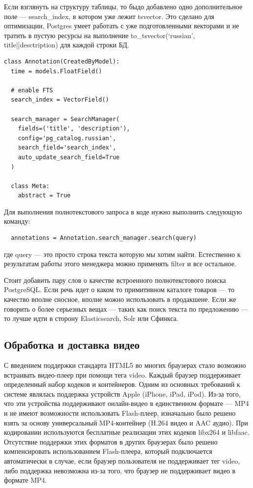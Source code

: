 Если взглянуть на структуру таблицы, то быдо добавлено одно дополнительное поле — search\_index,
в котором уже лежит tsvector. Это сделано для оптимизации, Postgres умеет работать с уже подготовленными векторами
и не тратить в пустую ресурсы на выполнение to\_tsvector(‘russian’, title||desctription) для каждой строки БД.

\FloatBarrier
\begin{lstlisting}[caption={Изменения в модели аннотации для возможности поиска}, label=lst:annotation]
class Annotation(CreatedByModel):
  time = models.FloatField()

  # enable FTS
  search_index = VectorField()

  search_manager = SearchManager(
    fields=('title', 'description'),
    config='pg_catalog.russian',
    search_field='search_index',
    auto_update_search_field=True
  )

  class Meta:
    abstract = True
\end{lstlisting}
\FloatBarrier

Для выполнения полнотекстового запроса в коде нужно выполнить следующую команду:
\begin{verbatim}
  annotations = Annotation.search_manager.search(query)
\end{verbatim}

где query — это просто строка текста которую мы хотим найти. Естественно к результатам работы этого менеджера
можно применять filter и все остальное.

Стоит добавить пару слов о качестве встроенного полнотекстового поиска PostgreSQL.
Если речь идет о каком то примитивном каталоге товаров — то качество вполне сносное, вполне можно использовать в продакшене.
Если же говорить о более серьезных вещах — таких как поиск текста по предложению — то лучше идти в сторону Elasticsearch, Solr
или Сфинкса.

\subsection{Обработка и доставка видео}

С введением поддержки стандарта HTML5 во многих браузерах стало возможно встраивать видео-плеер при помощи тега video.
Каждый браузер поддерживает определенный набор кодеков и контейнеров. Одним из основных требований к системе являлась
поддержка устройств Apple (iPhone, iPad, iPod). Из-за того, что эти устройства поддерживают онлайн-видео
в единственном формате — MP4 и не имеют возможности использовать Flash-плеер, изначально было решено взять за
основу универсальный MP4-контейнер (H.264 видео и AAC аудио). При кодировании используются бесплатные реализации этих
кодеков libx264 и libfaac. Отсутствие поддержки этих форматов в других браузерах было решено компенсировать
использованием Flash-плеера, который подключается автоматически в случае, если браузер пользователя не поддерживает
тег video, либо поддержка невозможна из-за того, что браузер не поддерживает видео в формате MP4.

